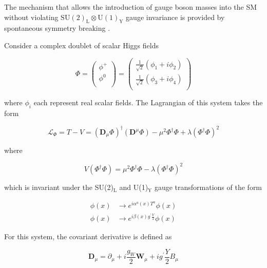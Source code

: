 \documentclass[12pt,a4paper,epsf,portrait,times,epsfig]{report}
\begin{document}
	The mechanism that allows the introduction of gauge boson masses into the SM without violating $\mathrm{SU(2)}_{\mathrm{L}} \otimes \mathrm{U(1)}_{\mathrm{Y}}$ gauge invariance is provided by spontaneous symmetry breaking \cite{Brout-Englert}\cite{Higgs}. \par


	Consider a complex doublet of scalar Higgs fields

	\begin{equation}
		\Phi=\begin{pmatrix}
			\phi^{+} \\
			\phi^{0} \\
		\end{pmatrix}=\begin{pmatrix}
			\frac{1}{\sqrt{2}}(\phi_{1}+i\phi_{2}) \\
			\frac{1}{\sqrt{2}}(\phi_{3}+i\phi_{4}) \\
		\end{pmatrix}
	\end{equation}

	where $\phi_{i}$ each represent real scalar fields. The Lagrangian of this system takes the form

	\begin{equation}
		\mathcal{L}_{\Phi} = T - V = (\textbf{D}_{\mu}\Phi)^{\dagger}(\textbf{D}^{\mu}\Phi)-\mu^{2}\Phi^{\dagger}\Phi+\lambda(\Phi^{\dagger}\Phi)^{2}
	\end{equation}

	where

	\begin{equation} \label{eq:HiggsPotential}
		V(\Phi^{\dagger}\Phi) = \mu^{2}\Phi^{\dagger}\Phi-\lambda(\Phi^{\dagger}\Phi)^{2}
	\end{equation}

	which is invariant under the SU(2)$_{\mathrm{L}}$ and U(1)$_{\mathrm{Y}}$ gauge transformations of the form 

	\begin{align}
		\phi(x) &\rightarrow e^{i\alpha^{a}(x)T^{a}}\phi(x) \\
		\phi(x) &\rightarrow e^{i\beta(x)g^{\prime}\frac{Y}{2}}\phi(x)
	\end{align}

	For this system, the covariant derivative is defined as

		\begin{equation}
			\textbf{D}_{\mu} = \partial_{\mu} + i\frac{g_{W}}{2}\textbf{W}_{\mu} + ig^{\prime}\frac{Y}{2}B_{\mu}
		\end{equation}
\end{document}
